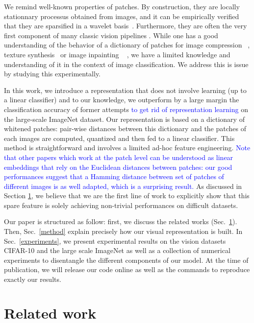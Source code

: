 \documentclass{article}
\newcommand{\Edouard}[1]{\textcolor{blue}{#1}}
\begin{document}
We remind well-known properties of patches. By construction,  they are locally stationnary processus obtained from images, and it can be empirically verified that they are sparsified in a wavelet basis~\citep{mallat1999wavelet}. Furthermore, they are often the very first component of many classic vision pipelines \citep{perronnin2010improving,lowe2004distinctive,brendel2019approximating,oyallon2018scattering}. While one has a good understanding of the behavior of a dictionary of patches for image compression
~\citep{wallace1992jpeg}, texture synthesis~\citep{efros1999texture} or image inpainting ~\citep{criminisi2004region} , we have a limited knowledge and understanding of it in the context of image classification. We address this is issue by studying this experimentally.

In this work, we introduce a   representation that does not involve learning (up to a linear classifier) and to our knowledge, we outperform by a large margin the classification accuracy of former attempts \Edouard{to get rid of representation learning} on the large-scale ImageNet dataset. Our representation is based on a dictionary of whitened patches: pair-wise distances between this dictionary and the patches of each images are computed, quantized and then fed to a linear classifier. This method is  straightforward and involves a limited ad-hoc feature engineering. \Edouard{Note that other papers which work at the patch level can be understood as linear embeddings that rely on the Euclidean distances between patches: our good performances suggest that a Hamming distance between set of patches of different images is as well adapted, which is a surprising result.} As discussed in Section \ref{related_work}, we believe that we are the first line of work to explicitly show that this  spare feature is solely achieving non-trivial performances on difficult datasets.

Our paper is structured as follow: first, we discuss the related works (Sec.~\ref{related_work}).
Then, Sec.~\ref{method} explain precisely how our visual representation is built.
In Sec.~\ref{experiments}, we present experimental results on the vision datasets CIFAR-10 and the large scale  ImageNet as well as a collection of numerical experiments to disentangle the different components of our model. At the time of publication, we will release our code online as well as the commands to reproduce exactly our results.


\section{Related work}
\label{related_work}
\end{document}
